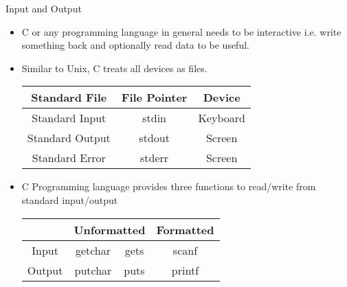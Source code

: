 \documentclass[10pt,t]{beamer}
\begin{document}
\begin{frame}{Input and Output}
  \begin{itemize}
    \item C or any programming language in general needs to be interactive i.e. write something back and optionally read data to be useful.
    \item Similar to Unix, C treats all devices as files.
      \begin{center}
        \begin{tabular}{ccc}
          \hline
          Standard File & File Pointer & Device \\
          \hline
          Standard Input & stdin & Keyboard \\
          Standard Output & stdout & Screen \\
          Standard Error & stderr & Screen\\
          \hline
        \end{tabular}
      \end{center}
      
    \item C Programming language provides three functions to read/write from standard input/output
      \begin{center}
        \begin{tabular}{|c|c|c|c|}
          \hline
          & \multicolumn{2}{c|}{Unformatted} & Formatted \\
          \hline
          Input & getchar & gets & scanf \\
          Output & putchar & puts & printf \\
          \hline
        \end{tabular}
      \end{center}
  \end{itemize}
\end{frame}
\end{document}
